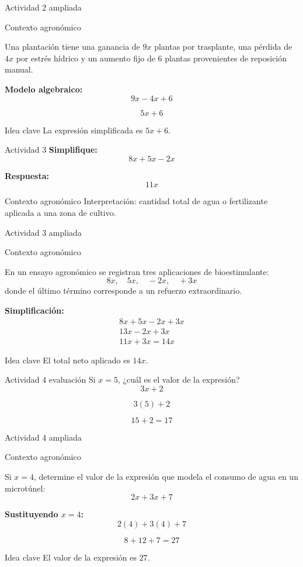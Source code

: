 \documentclass[handout,aspectratio=169,12pt]{beamer}
\newcommand{\IdeaClave}[1]{
	\begin{alertblock}{Idea clave}
		#1
	\end{alertblock}
}
\newcommand{\Agronomia}[1]{
	\begin{exampleblock}{Contexto agronómico}
		#1
	\end{exampleblock}
}
\begin{document}
	\begin{frame}{Actividad 2 ampliada}
		\Agronomia{
			Una plantación tiene una ganancia de \(9x\) plantas por trasplante, una pérdida de \(4x\) por estrés hídrico y un aumento fijo de 6 plantas provenientes de reposición manual.
		}
		
		\pause
		\textbf{Modelo algebraico:}
		\[
		9x-4x+6
		\]
		
		\pause
		\[
		5x+6
		\]
		
		\pause
		\IdeaClave{La expresión simplificada es \(5x+6\).}
	\end{frame}
	
	\begin{frame}{Actividad 3}
		\textbf{Simplifique:}
		\[
		8x+5x-2x
		\]
		
		\pause
		\textbf{Respuesta:}
		\[
		11x
		\]
		
		\pause
		\Agronomia{Interpretación: cantidad total de agua o fertilizante aplicada a una zona de cultivo.}
	\end{frame}
	
	\begin{frame}{Actividad 3 ampliada}
		\Agronomia{
			En un ensayo agronómico se registran tres aplicaciones de bioestimulante:
			\[
			8x,\quad 5x,\quad -2x,\quad +3x
			\]
			donde el último término corresponde a un refuerzo extraordinario.
		}
		
		\pause
		\textbf{Simplificación:}
		\[
		\begin{array}{c}
		  8x+5x-2x+3x \\
		  13x-2x+3x \\
		  11x+3x=14x
		\end{array}
		\]
		\IdeaClave{El total neto aplicado es \(14x\).}
	\end{frame}
	
	\begin{frame}{Actividad 4 evaluación}
		Si \(x=5\), ¿cuál es el valor de la expresión?
		\[
		3x+2
		\]
		
		\pause
		\[
		3(5)+2
		\]
		
		\pause
		\[
		15+2=17
		\]
	\end{frame}
	
	\begin{frame}{Actividad 4 ampliada}
		\Agronomia{
			Si \(x=4\), determine el valor de la expresión que modela el consumo de agua en un microtúnel:
			\[
			2x+3x+7
			\]
		}
		
		\pause
		\textbf{Sustituyendo \(x=4\):}
		\[
		2(4)+3(4)+7
		\]
		
		\pause
		\[
		8+12+7 = 27
		\]
		
		\pause
		\IdeaClave{El valor de la expresión es \(27\).}
	\end{frame}
	
\end{document}
